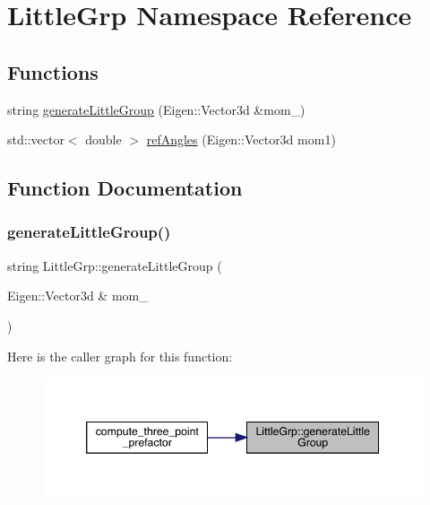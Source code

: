 \hypertarget{namespaceLittleGrp}{}\section{Little\+Grp Namespace Reference}
\label{namespaceLittleGrp}
\subsection*{Functions}
\begin{DoxyCompactItemize}
\item 
string \mbox{\hyperlink{namespaceLittleGrp_a12887808e1a825e9d2c387c5475bcf88}{generate\+Little\+Group}} (Eigen\+::\+Vector3d \&mom\+\_\+)
\item 
std\+::vector$<$ double $>$ \mbox{\hyperlink{namespaceLittleGrp_a93937e135b6b9c963ae9ad26516e252d}{ref\+Angles}} (Eigen\+::\+Vector3d mom1)
\end{DoxyCompactItemize}


\subsection{Function Documentation}
\mbox{\label{namespaceLittleGrp_a12887808e1a825e9d2c387c5475bcf88}} 
\subsubsection{\texorpdfstring{generateLittleGroup()}{generateLittleGroup()}}
{\footnotesize\ttfamily string Little\+Grp\+::generate\+Little\+Group (\begin{DoxyParamCaption}\item[{Eigen\+::\+Vector3d \&}]{mom\+\_\+ }\end{DoxyParamCaption})}

Here is the caller graph for this function\+:\nopagebreak
\begin{figure}[H]
\begin{center}
\leavevmode
\includegraphics[width=346pt]{d1/d4c/namespaceLittleGrp_a12887808e1a825e9d2c387c5475bcf88_icgraph}
\end{center}
\end{figure}
\mbox{\label{namespaceLittleGrp_a93937e135b6b9c963ae9ad26516e252d}} 
